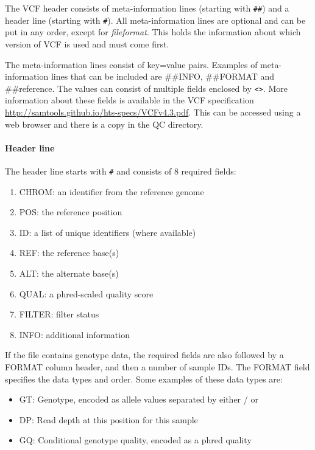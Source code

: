 \documentclass[11pt]{article}
\providecommand{\tightlist}{%
      \setlength{\itemsep}{0pt}\setlength{\parskip}{0pt}}
\begin{document}
The VCF header consists of meta-information lines (starting with
\texttt{\#\#}) and a header line (starting with \texttt{\#}). All
meta-information lines are optional and can be put in any order, except
for \textit{fileformat}. This holds the information about which version of
VCF is used and must come first.

The meta-information lines consist of key=value pairs. Examples of
meta-information lines that can be included are \#\#INFO, \#\#FORMAT and
\#\#reference. The values can consist of multiple fields enclosed by
\texttt{\textless{}\textgreater{}}. More information about these fields
is available in the VCF specification
\url{http://samtools.github.io/hts-specs/VCFv4.3.pdf}. This can be
accessed using a web browser and there is a copy in the QC directory.

\hypertarget{header-line}{%
\paragraph{Header line}\label{header-line}}

The header line starts with \texttt{\#} and consists of 8 required
fields:

\begin{enumerate}
\def\labelenumi{\arabic{enumi}.}
\tightlist
\item
  CHROM: an identifier from the reference genome
\item
  POS: the reference position
\item
  ID: a list of unique identifiers (where available)
\item
  REF: the reference base(s)
\item
  ALT: the alternate base(s)
\item
  QUAL: a phred-scaled quality score
\item
  FILTER: filter status
\item
  INFO: additional information
\end{enumerate}

If the file contains genotype data, the required fields are also
followed by a FORMAT column header, and then a number of sample IDs. The
FORMAT field specifies the data types and order. Some examples of these
data types are:

\begin{itemize}
\tightlist
\item
  GT: Genotype, encoded as allele values separated by either / or
  \textbar{}
\item
  DP: Read depth at this position for this sample
\item
  GQ: Conditional genotype quality, encoded as a phred quality
\end{itemize}
\end{document}
